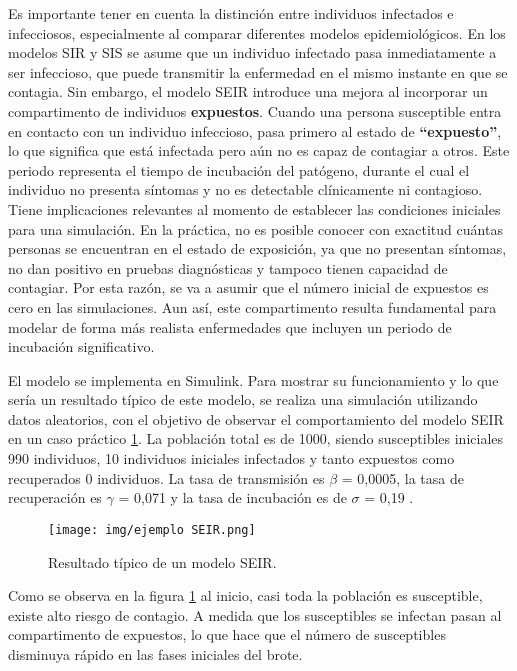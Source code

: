 Es importante tener en cuenta la distinción entre individuos infectados e infecciosos, especialmente al comparar diferentes modelos epidemiológicos. En los modelos SIR y SIS se asume que un individuo infectado pasa inmediatamente a ser infeccioso, que puede transmitir la enfermedad en el mismo instante en que se contagia. 
Sin embargo, el modelo SEIR introduce una mejora al incorporar un compartimento de individuos \textbf{expuestos}. Cuando una persona susceptible entra en contacto con un individuo infeccioso, pasa primero al estado de \textbf{“expuesto”}, lo que significa que está infectada pero aún no es capaz de contagiar a otros. Este periodo representa el tiempo de incubación del patógeno, durante el cual el individuo no presenta síntomas y no es detectable clínicamente ni contagioso.
Tiene implicaciones relevantes al momento de establecer las condiciones iniciales para una simulación. 
En la práctica, no es posible conocer con exactitud cuántas personas se encuentran en el estado de exposición, ya que no presentan síntomas, no dan positivo en pruebas diagnósticas y tampoco tienen capacidad de contagiar.
Por esta razón, se va a asumir que el número inicial de expuestos es cero en las simulaciones. Aun así, este compartimento resulta fundamental para modelar de forma más realista enfermedades que incluyen un periodo de incubación significativo.


El modelo se implementa en Simulink. Para mostrar su funcionamiento y lo que sería un resultado típico de este modelo, se realiza una simulación utilizando datos aleatorios, con el objetivo de observar el comportamiento del modelo SEIR en un caso práctico \ref{fig:eje SEIR}. La población total es de 1000, siendo susceptibles iniciales 990 individuos, 10 individuos iniciales infectados y tanto expuestos como recuperados 0 individuos.
La tasa de transmisión es $\beta$ = 0,0005, la tasa de recuperación es $\gamma$ = 0,071 y la tasa de incubación es de $\sigma$ = 0,19 .

\begin{figure}[H]
    \centering
    \texttt{[image: img/ejemplo SEIR.png]}
    \caption{Resultado típico de un modelo SEIR.}
    \label{fig:eje SEIR}
    
\end{figure}

Como se observa en la figura \ref{fig:eje SEIR} al inicio, casi toda la población es susceptible, existe alto riesgo de contagio. A medida que los susceptibles se infectan pasan al compartimento de expuestos, lo que hace que el número de susceptibles disminuya rápido en las fases iniciales del brote.

